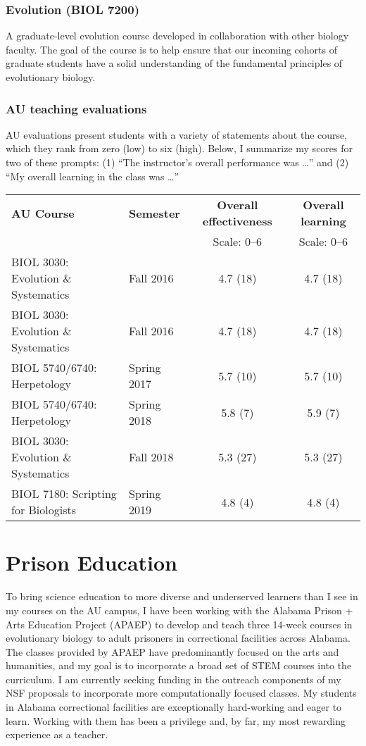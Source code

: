 \subsubsection*{Evolution (BIOL 7200)}
A graduate-level evolution course developed in collaboration with other biology
faculty.
The goal of the course is to help ensure that our incoming cohorts of graduate
students have a solid understanding of the fundamental principles of
evolutionary biology.

\subsubsection*{AU teaching evaluations}
AU evaluations present students with a variety of statements about the
course,
which they rank from zero (low) to six (high).
Below, I summarize my scores for two of these prompts:
(1) ``The instructor's overall performance was \ldots''
and
(2) ``My overall learning in the class was \ldots''
\begin{center}
\begin{tabular}{l l c c}
    \hline
    \textbf{AU Course} & \textbf{Semester} & \textbf{Overall effectiveness} & \textbf{Overall learning} \\
                       &                   & Scale: 0--6                    & Scale: 0--6 \\
    \hline
    BIOL 3030: Evolution \& Systematics & Fall 2016 & 4.7 (18) & 4.7 (18) \\
    BIOL 3030: Evolution \& Systematics & Fall 2016 & 4.7 (18) & 4.7 (18) \\
    BIOL 5740/6740: Herpetology & Spring 2017 & 5.7 (10) & 5.7 (10) \\
    BIOL 5740/6740: Herpetology & Spring 2018 & 5.8 (7) & 5.9 (7) \\
    BIOL 3030: Evolution \& Systematics & Fall 2018 & 5.3 (27) & 5.3 (27) \\
    BIOL 7180: Scripting for Biologists & Spring 2019 & 4.8 (4) & 4.8 (4) \\
    \hline
\end{tabular}
\end{center}

\section*{Prison Education}
To bring science education to more diverse and underserved learners than
I see in my courses on the AU campus,
I have been working with
the Alabama Prison + Arts Education Project (APAEP) to develop and teach three
14-week courses in evolutionary biology to adult prisoners in correctional
facilities across Alabama.
The classes provided by APAEP have predominantly focused on the
arts and humanities, and
my
goal is to incorporate a broad set of STEM courses into the
curriculum.
I am currently seeking funding in the outreach components of my
NSF proposals
to incorporate more computationally focused classes.
My students in Alabama correctional facilities are exceptionally hard-working
and eager to learn.
Working with them has been a privilege and, by far, my most rewarding
experience as a teacher.

